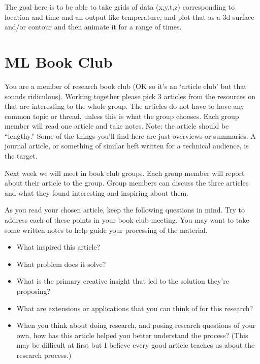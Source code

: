 \documentclass[letterpaper,10pt,english]{jupyterBook}
\begin{document}
\sphinxAtStartPar
The goal here is to be able to take grids of data (x,y,t,z) corresponding to location and time and an output like temperature, and plot that as a 3d surface and/or contour and then animate it for a range of times.

\sphinxstepscope


\chapter{ML Book Club}
\label{\detokenize{lessons/ML_Book_Club:ml-book-club}}\label{\detokenize{lessons/ML_Book_Club::doc}}
\sphinxAtStartPar
You are a member of research book club (OK so it’s an ‘article club’ but that sounds ridiculous). Working together please pick 3 articles from the resources on  that are interesting to the whole group. The articles do not have to have any common topic or thread, unless this is what the group chooses. Each group member will read one article and take notes. Note: the article should be “lengthy.” Some of the things you’ll find here are just overviews or summaries. A journal article, or something of similar heft written for a technical audience, is the target.

\sphinxAtStartPar
Next week we will meet in book club groups. Each group member will report about their article to the group. Group members can discuss the three articles and what they found interesting and inspiring about them.

\sphinxAtStartPar
As you read your chosen article, keep the following questions in mind. Try to address each of these points in your book club meeting. You may want to take some written notes to help guide your processing of the material.
\begin{itemize}
\item {} 
\sphinxAtStartPar
What inspired this article?

\item {} 
\sphinxAtStartPar
What problem does it solve?

\item {} 
\sphinxAtStartPar
What is the primary creative insight that led to the solution they’re proposing?

\item {} 
\sphinxAtStartPar
What are extensions or applications that you can think of for this research?

\item {} 
\sphinxAtStartPar
When you think about doing research, and posing research questions of your own, how has this article helped you better understand the process? (This may be difficult at first but I believe every good article teaches us about the research process.)

\end{itemize}







\renewcommand{\indexname}{Index}
\printindex
\end{document}
